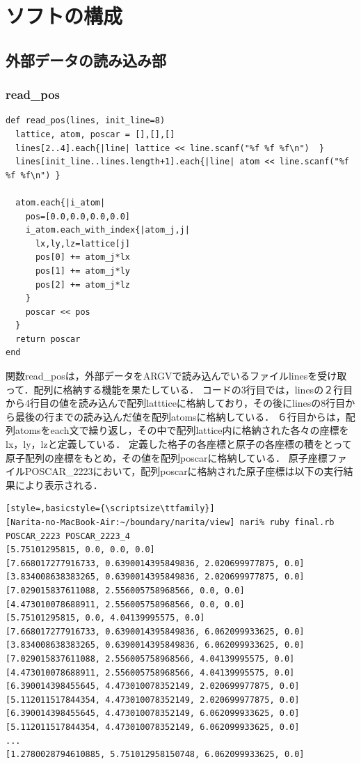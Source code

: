 
\section{ソフトの構成}
\subsection{外部データの読み込み部}
\subsubsection{read\_pos}\begin{lstlisting}[style=customRuby,basicstyle={\scriptsize\ttfamily}]
def read_pos(lines, init_line=8)
  lattice, atom, poscar = [],[],[]
  lines[2..4].each{|line| lattice << line.scanf("%f %f %f\n")  }
  lines[init_line..lines.length+1].each{|line| atom << line.scanf("%f %f %f\n") }

  atom.each{|i_atom|
    pos=[0.0,0.0,0.0,0.0]
    i_atom.each_with_index{|atom_j,j|
      lx,ly,lz=lattice[j]
      pos[0] += atom_j*lx
      pos[1] += atom_j*ly
      pos[2] += atom_j*lz
    }
    poscar << pos
  }
  return poscar
end
\end{lstlisting}
関数read\_posは，外部データをARGVで読み込んでいるファイルlinesを受け取って．配列に格納する機能を果たしている．
コードの3行目では，linesの２行目から4行目の値を読み込んで配列lattticeに格納しており，その後にlinesの8行目から最後の行までの読み込んだ値を配列atomsに格納している．
６行目からは，配列atomsをeach文で繰り返し，その中で配列lattice内に格納された各々の座標をlx，ly，lzと定義している．
定義した格子の各座標と原子の各座標の積をとって原子配列の座標をもとめ，その値を配列poscarに格納している．
原子座標ファイルPOSCAR\_2223において，配列poscarに格納された原子座標は以下の実行結果により表示される．
\begin{lstlisting}[style=,basicstyle={\scriptsize\ttfamily}]
[Narita-no-MacBook-Air:~/boundary/narita/view] nari% ruby final.rb POSCAR_2223 POSCAR_2223_4
[5.75101295815, 0.0, 0.0, 0.0]
[7.668017277916733, 0.6390014395849836, 2.020699977875, 0.0]
[3.834008638383265, 0.6390014395849836, 2.020699977875, 0.0]
[7.029015837611088, 2.556005758968566, 0.0, 0.0]
[4.473010078688911, 2.556005758968566, 0.0, 0.0]
[5.75101295815, 0.0, 4.04139995575, 0.0]
[7.668017277916733, 0.6390014395849836, 6.062099933625, 0.0]
[3.834008638383265, 0.6390014395849836, 6.062099933625, 0.0]
[7.029015837611088, 2.556005758968566, 4.04139995575, 0.0]
[4.473010078688911, 2.556005758968566, 4.04139995575, 0.0]
[6.390014398455645, 4.473010078352149, 2.020699977875, 0.0]
[5.112011517844354, 4.473010078352149, 2.020699977875, 0.0]
[6.390014398455645, 4.473010078352149, 6.062099933625, 0.0]
[5.112011517844354, 4.473010078352149, 6.062099933625, 0.0]
...
[1.2780028794610885, 5.751012958150748, 6.062099933625, 0.0]
\end{lstlisting}
